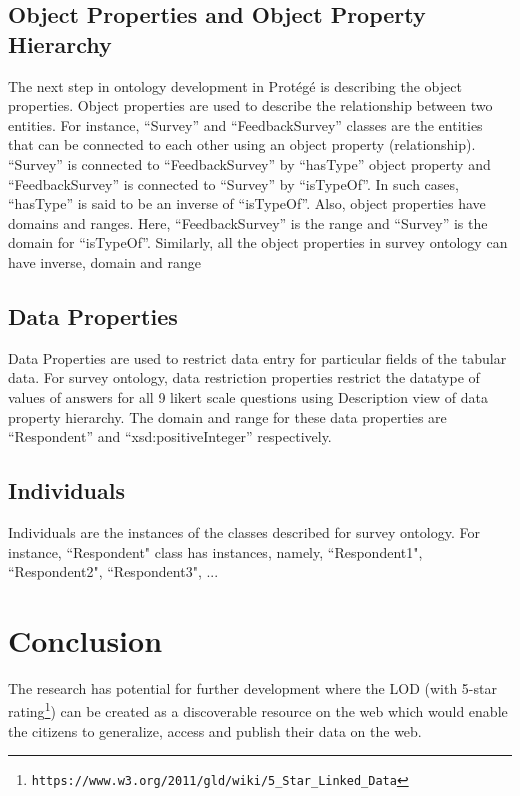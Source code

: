 \documentclass[runningheads]{llncs}
\begin{document}
\subsection{Object Properties and Object Property Hierarchy}
The next step in ontology development in Protégé is describing the object properties. 
Object properties are used to describe the relationship between two entities. 
For instance, ``Survey'' and ``FeedbackSurvey'' classes are the entities that can be connected to each other using an object property (relationship). ``Survey'' is connected to ``FeedbackSurvey'' by ``hasType'' object property and ``FeedbackSurvey'' is connected to ``Survey'' by ``isTypeOf''. In such cases, ``hasType'' is said to be an inverse of ``isTypeOf''. Also, object properties have domains and ranges. Here, ``FeedbackSurvey'' is the range and ``Survey'' is the domain for ``isTypeOf''. Similarly, all the object properties in survey ontology can have inverse, domain and range

\subsection{Data Properties}
Data Properties are used to restrict data entry for particular fields of the tabular data. For survey ontology, data restriction properties restrict the datatype of values of answers for all 9 likert scale questions using Description view of data property hierarchy. The domain and range for these data properties are ``Respondent'' and ``xsd:positiveInteger'' respectively.

\subsection{Individuals}
Individuals are the instances of the classes described for survey ontology. For instance, ``Respondent" class has instances, namely, ``Respondent1", ``Respondent2", ``Respondent3", ...
\section{Conclusion}
The research has potential for further development where the LOD 
(with 5-star rating\footnote{\tt https://www.w3.org/2011/gld/wiki/5\_Star\_Linked\_Data}) 
can be created as a discoverable resource on the web which would enable the citizens to generalize, access and publish their data on the web.

%
%
%


\end{document}
